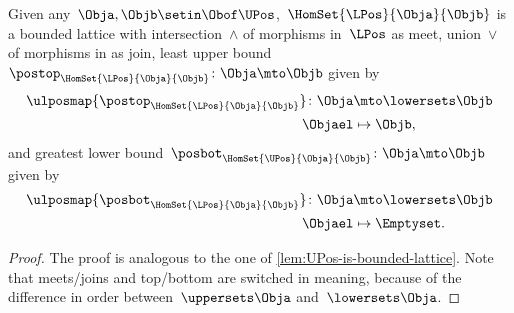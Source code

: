 \begin{lemma}
    \label{lem:LPos-is-bounded-lattice}
    Given any~$\Obja,\Objb\setin \Obof\UPos$,~$\HomSet{\LPos}{\Obja}{\Objb}$ is a bounded lattice with intersection~$\wedge$ of morphisms in~$\LPos$ as meet, union~$\vee$ of morphisms in \LPos as join, least upper bound~$\postop_{\HomSet{\LPos}{\Obja}{\Objb}}\colon \Obja \mto \Objb$ given by
    \begin{equation}
        \begin{aligned}
            \ulposmap{\postop_{\HomSet{\LPos}{\Obja}{\Objb}}}\colon \Obja & \mto \lowersets \Objb \\
            \Objael                                                       & \mapsto \Objb,
        \end{aligned}
    \end{equation}
    and greatest lower bound~$\posbot_{\HomSet{\UPos}{\Obja}{\Objb}}\colon \Obja \mto \Objb$ given by
    \begin{equation}
        \begin{aligned}
            \ulposmap{\posbot_{\HomSet{\LPos}{\Obja}{\Objb}}}\colon \Obja & \mto \lowersets \Objb \\
            \Objael                                                       & \mapsto \Emptyset.
        \end{aligned}
    \end{equation}
\end{lemma}
\begin{proof}
    The proof is analogous to the one of \cref{lem:UPos-is-bounded-lattice}.
    Note that meets/joins and top/bottom are switched in meaning, because of the difference in order between~$\uppersets \Obja$ and~$\lowersets \Obja$.
\end{proof}

